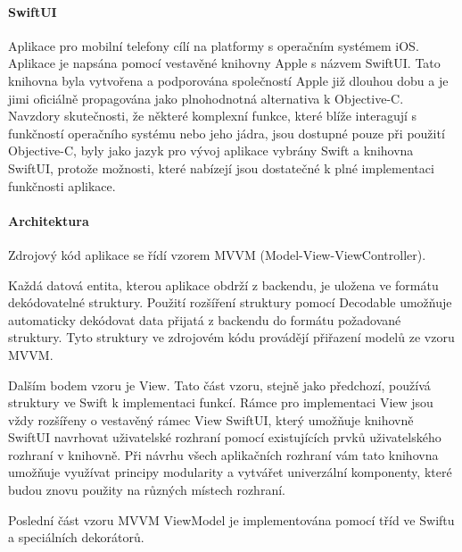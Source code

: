 \documentclass[a4paper, 11pt]{article}
\begin{document}
\paragraph{SwiftUI}
Aplikace pro mobilní telefony cílí na platformy s operačním systémem iOS. Aplikace je napsána pomocí vestavěné knihovny Apple s názvem SwiftUI. Tato knihovna byla vytvořena a podporována společností Apple již dlouhou dobu a je jimi oficiálně propagována jako plnohodnotná alternativa k Objective-C. Navzdory skutečnosti, že některé komplexní funkce, které blíže interagují s funkčností operačního systému nebo jeho jádra, jsou dostupné pouze při použití Objective-C, byly jako jazyk pro vývoj aplikace vybrány Swift a knihovna SwiftUI, protože možnosti, které nabízejí jsou dostatečné k plné implementaci funkčnosti aplikace.

\paragraph{Architektura}
Zdrojový kód aplikace se řídí vzorem MVVM (Model-View-ViewController).

Každá datová entita, kterou aplikace obdrží z backendu, je uložena ve formátu dekódovatelné struktury. Použití rozšíření struktury pomocí Decodable umožňuje automaticky dekódovat data přijatá z backendu do formátu požadované struktury. Tyto struktury ve zdrojovém kódu provádějí přiřazení modelů ze vzoru MVVM.

Dalším bodem vzoru je View. Tato část vzoru, stejně jako předchozí, používá struktury ve Swift k implementaci funkcí. Rámce pro implementaci View jsou vždy rozšířeny o vestavěný rámec View SwiftUI, který umožňuje knihovně SwiftUI navrhovat uživatelské rozhraní pomocí existujících prvků uživatelského rozhraní v knihovně. Při návrhu všech aplikačních rozhraní vám tato knihovna umožňuje využívat principy modularity a vytvářet univerzální komponenty, které budou znovu použity na různých místech rozhraní.

Poslední část vzoru MVVM ViewModel je implementována pomocí tříd ve Swiftu a speciálních dekorátorů.
\end{document}
